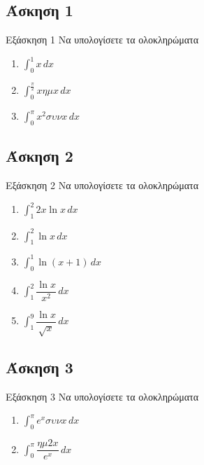 \documentclass[greek]{beamer}
\begin{document}
\subsection{Άσκηση 1}
\begin{frame}[label=Άσκηση1,t]{Εξάσκηση 1}
  Να υπολογίσετε τα ολοκληρώματα
  \begin{enumerate}
    \item<1-> $\int_{0}^{1}x\,dx$
    \item<2-> $\int_{0}^{\frac{π}{2}}xημx\,dx$
    \item<3-> $\int_{0}^{π}x^2συνx\,dx$
  \end{enumerate}

\end{frame}

\subsection{Άσκηση 2}
\begin{frame}[label=Άσκηση2,t]{Εξάσκηση 2}
  Να υπολογίσετε τα ολοκληρώματα
  \begin{enumerate}
    \item<1-> $\int_{1}^{2} 2x\ln x \,dx$
    \item<2-> $\int_{1}^{2} \ln x \,dx$
    \item<3-> $\int_{0}^{1} \ln (x+1) \,dx$
    \item<4-> $\int_{1}^{2} \dfrac{\ln x}{x^2} \,dx$
    \item<5-> $\int_{1}^{9} \dfrac{\ln x}{\sqrt{x}} \,dx$
  \end{enumerate}

\end{frame}

\subsection{Άσκηση 3}
\begin{frame}[label=Άσκηση3,t]{Εξάσκηση 3}
  Να υπολογίσετε τα ολοκληρώματα
  \begin{enumerate}
    \item<1-> $\int_{0}^{π} e^xσυνx \,dx$
    \item<2-> $\int_{0}^{π} \dfrac{ημ2x}{e^x} \,dx$
  \end{enumerate}

\end{frame}
\end{document}

